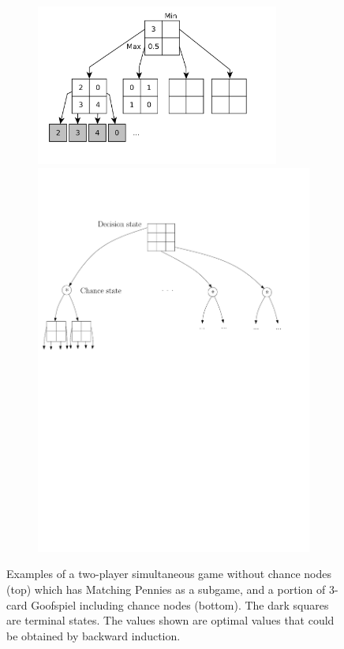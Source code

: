 \documentclass[preprint,12pt]{elsarticle}
\begin{document}
\begin{figure}[b!]
\centering
\begin{subfigure}{12cm}
\centering
\includegraphics[width=8.0cm]{figures/tree}\\
\includegraphics[width=10.0cm]{figures/goof3}\\
\end{subfigure}%
\caption{Examples of a two-player simultaneous game without chance nodes (top) which has Matching Pennies as a 
subgame, and a portion of 3-card Goofspiel including chance nodes (bottom).
The dark squares are terminal states. The values shown are optimal values that could be obtained by backward induction.\\
\label{fig:example}}
\end{figure}
\end{document}
